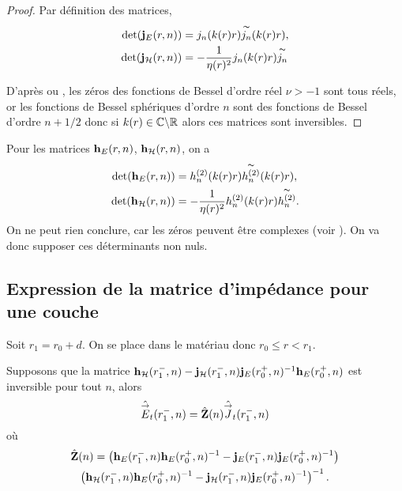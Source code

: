         \begin{proof}
        Par définition des matrices,
        \begin{align*}
            \det(\mathbf{j}_E(r,n)) &= j_n(k(r)r)\overset{\thicksim}{j_n}(k(r)r),
            \\
            \det(\mathbf{j}_{\mathcal{H}}(r,n)) &= -\dfrac{1}{\eta(r)^2}j_n(k(r)r)\overset{\thicksim}{j_n}
        \end{align*}

        D’après \cite[p.~370]{abramowitz_handbook_1964} ou \cite[\url{https://dlmf.nist.gov/10.58}]{dlmf_nist_2019}, les zéros des fonctions de Bessel d'ordre réel \(\nu >-1\) sont tous réels, or les fonctions de Bessel sphériques d'ordre \(n\) sont des fonctions de Bessel d'ordre \(n+1/2\) donc si \(k(r) \in\mathbb C\backslash\mathbb R\) alors ces matrices sont inversibles.
    \end{proof}


    Pour les matrices \(\mathbf{h}_E(r,n)\), \(\mathbf{h}_{\mathcal{H}}(r,n)\), on a
    \begin{align*}
        \det(\mathbf{h}_E(r,n)) &= h^{(2)}_n(k(r)r)\overset{\thicksim}{h^{(2)}_n}(k(r)r),
        \\
        \det(\mathbf{h}_{\mathcal{H}}(r,n)) &= -\dfrac{1}{\eta(r)^2}h^{(2)}_n(k(r)r)\overset{\thicksim}{h^{(2)}_n}.
     \end{align*}
    On ne peut rien conclure, car les zéros peuvent être complexes (voir \cite{sandstrom_note_2007}). On va donc supposer ces déterminants non nuls.




  \subsection{Expression de la matrice d'impédance pour une couche}

    Soit \(r_1 = r_0 + d\). On se place dans le matériau donc \(r_0 \le r < r_1\).

    \begin{prop}
        Supposons que la matrice \(\mathbf{h}_{\mathcal{H}}(r_1^-,n) - \mathbf{j}_{\mathcal{H}}(r_1^-,n)\mathbf{j}_{E}(r_0^+,n)^{-1}\mathbf{h}_{E}(r_0^+,n)\) est inversible pour tout \(n\), alors
        \begin{equation*}
            \hat {{\overset{\rightarrow}{E}}}_t(r_1^-,n) = \hat {\mathbf{Z}}(n) \hat {{\overset{\rightarrow}{J}}}_t(r_1^-,n)
        \end{equation*}
        où
        \begin{multline*}
            \hat {\mathbf{Z}}(n) =
            \left(\mathbf{h}_{E}(r_1^-,n)\mathbf{h}_{E}(r_0^+,n)^{-1} - \mathbf{j}_{E}(r_1^-,n)\mathbf{j}_{E}(r_0^+,n)^{-1}\right)\\
            \left(\mathbf{h}_{\mathcal{H}}(r_1^-,n)\mathbf{h}_{E}(r_0^+,n)^{-1} - \mathbf{j}_{\mathcal{H}}(r_1^-,n)\mathbf{j}_{E}(r_0^+,n)^{-1}\right)^{-1}.
        \end{multline*}
    \end{prop}

